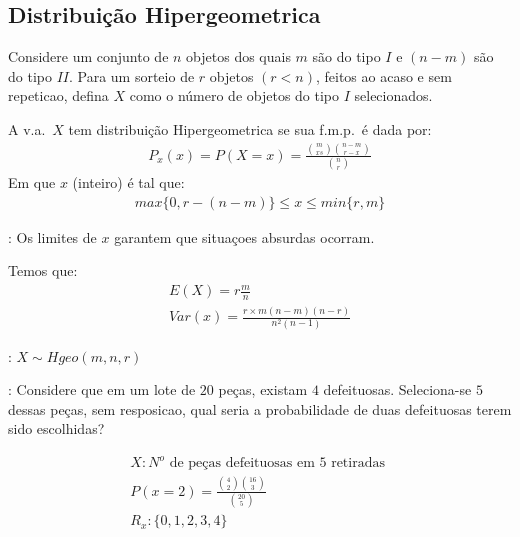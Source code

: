  \subsection{Distribuição Hipergeometrica}
\begin{description}
  \item
Considere um conjunto de $n$ objetos dos quais $m$ são do tipo $I$
e $(n-m) $ são do tipo $II$. Para um sorteio de $r$ objetos $(r<n)$, 
feitos ao acaso e sem repeticao, defina $X$ como o número de objetos do tipo
$I$ selecionados.
  \item[Definição:] A v.a.\ $X$ tem distribuição Hipergeometrica se sua f.m.p.\ é dada
    por:
    \begin{align*}
      P_x(x)= P(X=x)= \frac{\binom{m}{xs} \binom{n-m}{r-x}}{\binom{n}{r}}
    \end{align*}
    Em que $x$ (inteiro) é tal que:
    \begin{align*}
      max \{0,r-(n-m)\} \leq x \leq min \{ r,m \}
    \end{align*}
  \item[Observação]: Os limites de $x$ garantem que situaçoes absurdas ocorram.
  \item Temos que: 
    \begin{align*}
      E(X) = r \frac{m}{n} \\
      Var(x)= \frac{r\times m (n-m)(n-r)}{n^2 (n-1)}
    \end{align*}
    \begin{figure}[H]
      \centering
      
      \caption{}
      \label{fig:x}
    \end{figure}
  \item[Notacao]: $X \mathtt{\sim} Hgeo (m,n,r)$
  \item[Exemplo]: Considere que em um lote de $20$ peças, existam $4$ defeituosas.
    Seleciona-se $5$ dessas peças, sem resposicao, qual seria a probabilidade 
    de duas defeituosas terem sido escolhidas?
\begin{figure}[H]
  \centering
  
  \label{fig:x2}
\end{figure}
    \begin{align*}
      X: \text{$N^{o}$  de peças defeituosas em $5$ retiradas }\\
      P(x=2)=\frac{\binom{4}{2} \binom{16}{3}}{\binom{20}{5}}\\
      R_{x}: \{ 0,1,2,3,4 \}
    \end{align*}
\end{description}
